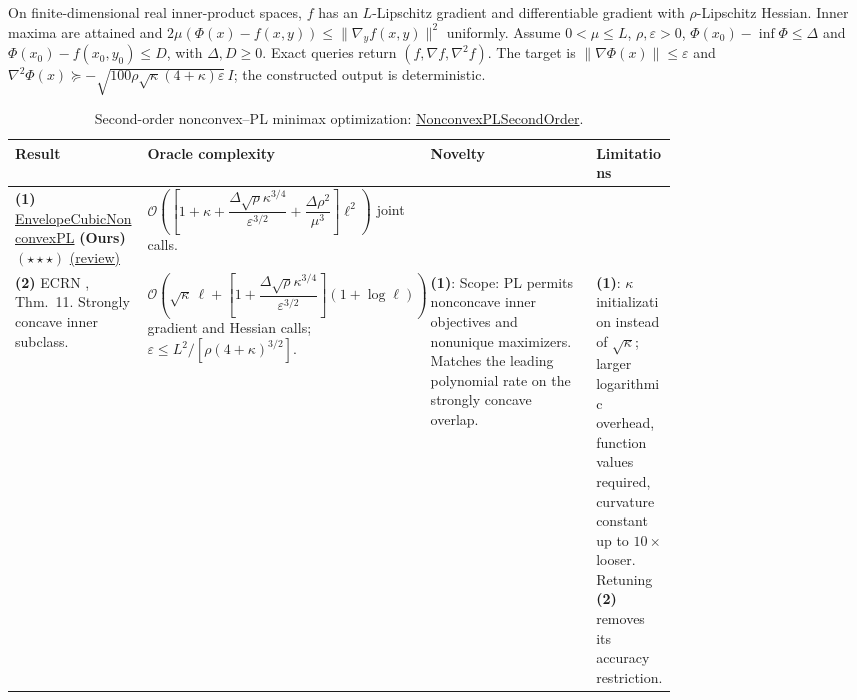 \begin{table}[tp]
\centering
\caption{Second-order nonconvex--PL minimax optimization: \href{https://github.com/k3nfalt/longtails/blob/main/LongTails/Setups/NonconvexPLSecondOrder.lean}{NonconvexPLSecondOrder}.}\label{tab:NonconvexPLSecondOrder}
\parbox{\linewidth}{\footnotesize On finite-dimensional real inner-product spaces, $f$ has an $L$-Lipschitz gradient and differentiable gradient with $\rho$-Lipschitz Hessian. Inner maxima are attained and $2\mu(\Phi(x)-f(x,y))\le\|\nabla_y f(x,y)\|^2$ uniformly. Assume $0<\mu\le L$, $\rho,\varepsilon>0$, $\Phi(x_0)-\inf\Phi\le\Delta$ and $\Phi(x_0)-f(x_0,y_0)\le D$, with $\Delta,D\ge0$. Exact queries return $(f,\nabla f,\nabla^2f)$. The target is $\|\nabla\Phi(x)\|\le\varepsilon$ and $\nabla^2\Phi(x)\succeq-\sqrt{100\rho\sqrt\kappa(4+\kappa)\varepsilon}\,I$; the constructed output is deterministic.}\par\smallskip
\begin{threeparttable}
\footnotesize
\setlength{\tabcolsep}{4pt}\renewcommand{\arraystretch}{1.25}
\begin{tabularx}{\linewidth}{@{}>{\raggedright\arraybackslash}p{0.20\linewidth}>{\raggedright\arraybackslash}p{0.32\linewidth}>{\raggedright\arraybackslash}p{0.25\linewidth}>{\raggedright\arraybackslash}X@{}}
\toprule
\textbf{Result} & \textbf{Oracle complexity} & \textbf{Novelty} & \textbf{Limitations} \\
\midrule
\textbf{(1)} \href{https://github.com/k3nfalt/longtails/blob/main/LongTails/Theorems/EnvelopeCubicNonconvexPL.lean}{Envelope\allowbreak Cubic\allowbreak Nonconvex\allowbreak PL} \textbf{(Ours)} $(\star\star\star)$ \href{https://github.com/k3nfalt/longtails/blob/main/scripts/reviews/EnvelopeCubicNonconvexPL.md}{(review)}
& $\mathcal{O}\!\left(\left[1+\kappa+\dfrac{\Delta\sqrt\rho\kappa^{3/4}}{\varepsilon^{3/2}}+\dfrac{\Delta\rho^2}{\mu^3}\right]\ell^2\right)$ joint calls. & & \\
\midrule[1.2pt]
\textbf{(2)} ECRN \citep{ncplZhou2026}, Thm.~11. Strongly concave inner subclass.
& $\mathcal{O}\!\left(\sqrt\kappa\,\ell+\left[1+\dfrac{\Delta\sqrt\rho\kappa^{3/4}}{\varepsilon^{3/2}}\right](1+\log\ell)\right)$ gradient and Hessian calls; $\varepsilon\le L^2/[\rho(4+\kappa)^{3/2}]$.
& \textbf{(1)}: Scope: PL permits nonconcave inner objectives and nonunique maximizers. Matches the leading polynomial rate on the strongly concave overlap.
& \textbf{(1)}: $\kappa$ initialization instead of $\sqrt\kappa$; larger logarithmic overhead, function values required, curvature constant up to $10\times$ looser. Retuning \textbf{(2)} removes its accuracy restriction. \\

\end{tabularx}
\end{threeparttable}
\end{table}
